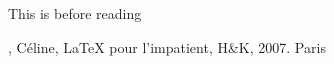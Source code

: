 \documentclass[a4paper]{article}
\begin{document}
  This is before reading \cite{Chevalier}
  \begin{thebibliography}{abcd}
   , Céline, LaTeX pour l'impatient, 
   H\&K, 2007. Paris
  \end{thebibliography}
\end{document}
